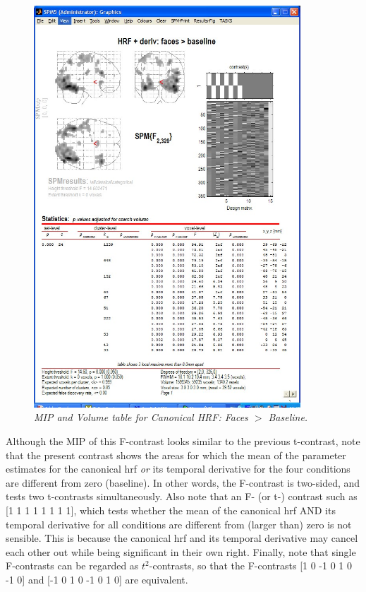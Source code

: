 \documentclass[a4paper,titlepage]{book}
\begin{document}
\begin{figure}
\begin{center}
\includegraphics[width=100mm]{cat1_volume}
\caption{\em MIP and Volume table for Canonical HRF: Faces  $>$ Baseline. \label{cat1_volume} }
\end{center}
\end{figure}
Although the MIP of this F-contrast looks similar to the previous t-contrast, note that the present contrast shows the areas for which the mean of the parameter estimates for the canonical hrf {\em or} its temporal derivative for the four conditions are different from zero (baseline). In other words, the F-contrast is two-sided, and tests two t-contrasts simultaneously. Also note that an F- (or t-) contrast such as [1 1 1 1 1 1 1 1], which tests whether the mean of the canonical hrf AND its temporal derivative for all conditions are different from (larger than) zero is not sensible. This is because the canonical hrf and its temporal derivative may cancel each other out while being significant in their own right. Finally, note that single F-contrasts can be regarded as $t^2$-contrasts, so that the F-contrasts [1 0 -1 0 1 0 -1 0] and [-1 0 1 0 -1 0 1 0] are equivalent. 
\end{document}
